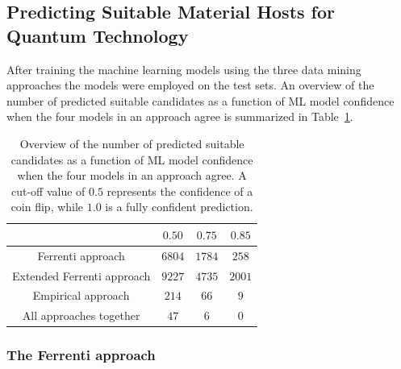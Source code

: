 \documentclass[superscriptaddress,unsortedaddress,
 amsmath,amssymb,
 aps,
]{revtex4-2}
\begin{document}
\subsection*{Predicting Suitable Material Hosts for Quantum Technology} 
After training the machine learning models using the three data mining approaches the models were employed on the test sets. An overview of the number of predicted suitable candidates as a function of ML model confidence when the four models in an approach agree is summarized in Table~\ref{tab:probabilites}. 

\begin{table}[b]
    \centering 
    \caption{Overview of the number of predicted suitable candidates as a function of ML model confidence when the four models in an approach agree. A cut-off value of $0.5$ represents the confidence of a coin flip, while $1.0$ is a fully confident prediction.}
    \begin{tabular}{c|c|c|c}
      & $0.50$ & $0.75$ & $0.85$ \\
     \hline
     Ferrenti approach &  $6804$ & $1784$ & $258$  \\
     Extended Ferrenti approach &  $9227$ & $4735$  & $2001$  \\ 
     Empirical approach & $214$ & $66$ & $9$ \\
     \hline
     All approaches together & $47$ & $6$ & 0 \\
    \end{tabular}
    \label{tab:probabilites}
\end{table} 

\subsubsection*{The Ferrenti approach}
\end{document}
